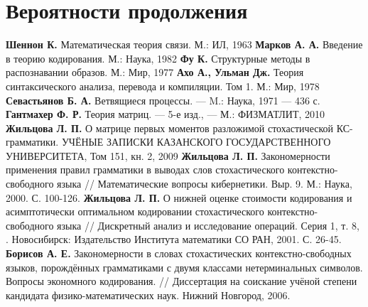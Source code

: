 \documentclass[12pt]{article}
\begin{document}
\section{Вероятности продолжения}

\begin{thebibliography}{99}
	\textbf{Шеннон К.} Математическая теория связи. М.: ИЛ, 1963
	\textbf{Марков А. А.} Введение в теорию кодирования. М.: Наука, 1982
	\textbf{Фу К.} Структурные методы в распознавании образов. М.: Мир, 1977
	\textbf{Ахо А., Ульман Дж.} Теория синтаксического анализа, перевода и компиляции. Том 1. М.: Мир, 1978
	\textbf{Севастьянов Б. А.} Ветвящиеся процессы. --- M.: Наука, 1971 --- 436 с.
	\textbf{Гантмахер Ф. Р.} Теория матриц. --- 5-е изд., --- М.: ФИЗМАТЛИТ, 2010
	\textbf{Жильцова Л. П.} О матрице первых моментов разложимой стохастической КС-грамматики. УЧЁНЫЕ ЗАПИСКИ КАЗАНСКОГО ГОСУДАРСТВЕННОГО УНИВЕРСИТЕТА, Том 151, кн. 2, 2009
	\textbf{Жильцова Л. П.} Закономерности применения правил грамматики в выводах слов стохастического контекстно-свободного языка // Математические вопросы кибернетики. Выр. 9. М.: Наука, 2000. С. 100-126.
	\textbf{Жильцова Л. П.} О нижней оценке стоимости кодирования и асимптотически оптимальном кодировании стохастического контекстно-свободного языка // Дискретный анализ и исследование операций. Серия 1, т. 8, . Новосибирск: Издательство Института математики СО РАН, 2001. С. 26-45.
	\textbf{Борисов А. Е.} Закономерности в словах стохастических контекстно-свободных языков, порождённых грамматиками с двумя классами нетерминальных символов. Вопросы экономного кодирования. // Диссертация на соискание учёной степени кандидата физико-математических наук. Нижний Новгород, 2006.
\end{thebibliography}
\end{document}
